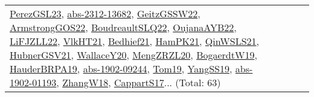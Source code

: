 {\begin{longtable}{lp{3cm}>{\raggedright}p{6cm}>{\raggedright}p{6cm}p{8cm}}
\href{papers/PerezGSL23.pdf}{PerezGSL23}\cite{PerezGSL23}, \href{articles/abs-2312-13682.pdf}{abs-2312-13682}\cite{abs-2312-13682}, \href{papers/GeitzGSSW22.pdf}{GeitzGSSW22}\cite{GeitzGSSW22}, \href{papers/ArmstrongGOS22.pdf}{ArmstrongGOS22}\cite{ArmstrongGOS22}, \href{papers/BoudreaultSLQ22.pdf}{BoudreaultSLQ22}\cite{BoudreaultSLQ22}, \href{papers/OujanaAYB22.pdf}{OujanaAYB22}\cite{OujanaAYB22}, \href{papers/LiFJZLL22.pdf}{LiFJZLL22}\cite{LiFJZLL22}, \href{articles/VlkHT21.pdf}{VlkHT21}\cite{VlkHT21}, \href{articles/Bedhief21.pdf}{Bedhief21}\cite{Bedhief21}, \href{articles/HamPK21.pdf}{HamPK21}\cite{HamPK21}, \href{articles/QinWSLS21.pdf}{QinWSLS21}\cite{QinWSLS21}, \href{articles/HubnerGSV21.pdf}{HubnerGSV21}\cite{HubnerGSV21}, \href{articles/WallaceY20.pdf}{WallaceY20}\cite{WallaceY20}, \href{articles/MengZRZL20.pdf}{MengZRZL20}\cite{MengZRZL20}, \href{papers/BogaerdtW19.pdf}{BogaerdtW19}\cite{BogaerdtW19}, \href{articles/HauderBRPA19.pdf}{HauderBRPA19}\cite{HauderBRPA19}, \href{articles/abs-1902-09244.pdf}{abs-1902-09244}\cite{abs-1902-09244}, \href{papers/Tom19.pdf}{Tom19}\cite{Tom19}, \href{papers/YangSS19.pdf}{YangSS19}\cite{YangSS19}, \href{articles/abs-1902-01193.pdf}{abs-1902-01193}\cite{abs-1902-01193}, \href{articles/ZhangW18.pdf}{ZhangW18}\cite{ZhangW18}, \href{papers/CappartS17.pdf}{CappartS17}\cite{CappartS17}... (Total: 63)\\

\end{longtable}}
